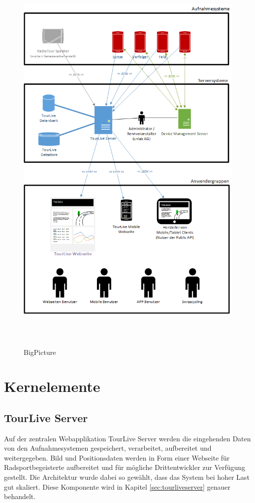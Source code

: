\begin{figure}[H]
	\centering
	\includegraphics[height=200mm]{images/BigPicture.png}
	\caption{BigPicture}
	\label{fig:bigpicture}
\end{figure}

\pagebreak

\section{Kernelemente}
\subsection{TourLive Server}
Auf der zentralen Webapplikation TourLive Server werden die eingehenden Daten von den Aufnahmesystemen gespeichert, verarbeitet, aufbereitet und weitergegeben. Bild und Positionsdaten werden in Form einer Webseite für Radsportbegeisterte aufbereitet und für mögliche Drittentwickler zur Verfügung gestellt. Die Architektur wurde dabei so gewählt, dass das System bei hoher Last gut skaliert. Diese Komponente wird in Kapitel \ref{sec:tourliveserver} genauer behandelt.

